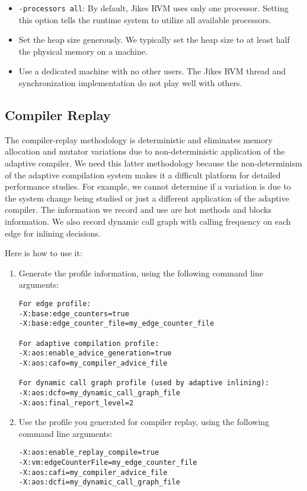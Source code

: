 \begin{itemize}
\item {\tt -processors all}: By default, Jikes\TMweb{} RVM uses only
one processor.  Setting this option tells the runtime system to
utilize all available processors. 
\item Set the heap size generously.  We typically set the heap size to
at least half the physical memory on a machine. 
\item Use a dedicated machine with no other users.  The Jikes RVM
thread and synchronization implementation do not play well with
others. 
\end{itemize}

\subsection{Compiler Replay}
The compiler-replay methodology is deterministic and eliminates
memory allocation and mutator variations due to non-deterministic
application of the adaptive compiler.  We need this latter methodology
because the non-determinism of the adaptive compilation system
makes it a difficult platform for detailed performance studies.  For
example, we cannot determine if a variation is due to the system
change being studied or just a different application of the adaptive
compiler. The information we record and use are hot methods and blocks
information. We also record dynamic call graph with calling frequency
on each edge for inlining decisions.

Here is how to use it:
\begin{enumerate}
\item Generate the profile information, using the following command
line arguments:
\begin{verbatim}
For edge profile:
-X:base:edge_counters=true
-X:base:edge_counter_file=my_edge_counter_file

For adaptive compilation profile:
-X:aos:enable_advice_generation=true
-X:aos:cafo=my_compiler_advice_file

For dynamic call graph profile (used by adaptive inlining):
-X:aos:dcfo=my_dynamic_call_graph_file
-X:aos:final_report_level=2
\end{verbatim}

\item Use the profile you generated for compiler replay, using the
following command line arguments:
\begin{verbatim}
-X:aos:enable_replay_compile=true
-X:vm:edgeCounterFile=my_edge_counter_file
-X:aos:cafi=my_compiler_advice_file
-X:aos:dcfi=my_dynamic_call_graph_file
\end{verbatim}
\end{enumerate}

